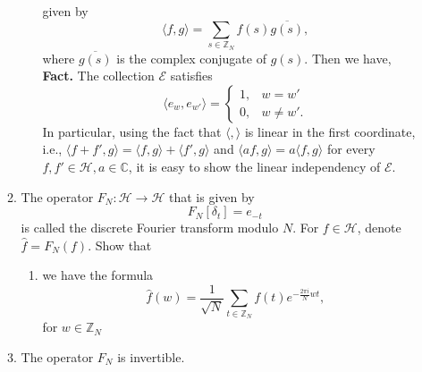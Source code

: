 \documentclass{article}
\def\zz{{\mathbb Z}}
\def\cc{{\mathbb C}}
\begin{document}
\begin{problem}
\begin{enumerate}[(a)]
\begin{enumerate}[1.]
\begin{itemize}
\begin{equation*}
                \end{equation*}
                given by 
                \begin{equation*}
                    \langle f, g \rangle = \sum_{s \in \zz_N} f(s) \overline{g(s)},
                \end{equation*}
                where $\overline{g(s)}$ is the complex conjugate of $g(s)$. Then we have, \\
                \textbf{Fact.} The collection $\mathscr{E}$ satisfies
                \begin{equation*}
                    \langle e_w, e_{w'} \rangle = \begin{cases}
                        1, & w = w' \\
                        0, & w \neq w'.
                    \end{cases}
                \end{equation*}
                In particular, using the fact that $\langle , \rangle$ is linear in the first coordinate, i.e., $\langle f + f', g \rangle = \langle f, g \rangle + \langle f', g \rangle$ and $\langle a f, g \rangle = a \langle f, g \rangle$ for every $f,f' \in \mathscr{H}, a \in \cc$, it is easy to show the linear independency of $\mathscr{E}$.
            \end{itemize}
            \item The operator $F_N : \mathscr{H} \to \mathscr{H}$ that is given by 
            \begin{equation*}
                F_N[\delta_t] = e_{-t}
            \end{equation*}
            is called the discrete Fourier transform modulo $N$. For $f \in \mathscr{H}$, denote $\hat{f} = F_N(f)$. Show that 
            \begin{enumerate}[1.]
                \item we have the formula
                \begin{equation*}
                    \hat{f}(w) = \frac{1}{\sqrt{N}} \sum_{t \in \zz_N}f(t) e^{-\frac{2 \pi i}{N} w t},
                \end{equation*}
                for $w \in \zz_N$
            \end{enumerate}
            \item The operator $F_N$ is invertible.
        \end{enumerate}
    \end{enumerate}
\end{problem}
\end{document}
